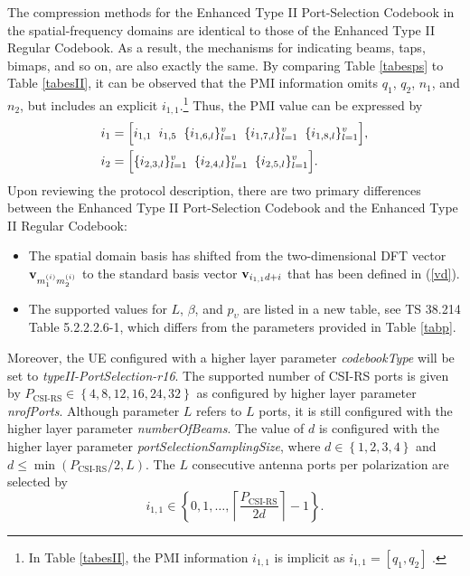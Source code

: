 \documentclass[lettersize,journal]{IEEEtran}
\begin{document}
\begin{appendices}
The compression methods for the Enhanced Type II Port-Selection Codebook in the spatial-frequency domains are identical to those of the Enhanced Type II Regular Codebook. As a result, the mechanisms for indicating beams, taps, bimaps, and so on, are also exactly the same. By comparing Table \ref{tabesps} to Table \ref{tabesII}, it can be observed that the PMI information omits $q_1$, $q_2$, $n_1$, and $n_2$, but includes an explicit $i_{1,1}$.\footnote{In Table \ref{tabesII}, the PMI information $i_{1,1}$ is implicit as $i_{1,1} = [q_1,q_2]$ .} Thus, the PMI value can be expressed by 
\begin{align}\label{a86}
&{i_1} = \Big[ {{i_{1,1}}\;\;{i_{1,5}}\;\;\{ {i_{1,6,l}}\} _{l = 1}^v\;\;\{ {i_{1,7,l}}\} _{l = 1}^v\;\;\{ {i_{1,8,l}}\} _{l = 1}^v} \Big],\notag\\
&{i_2} = \Big[ \{{{i_{2,3,l}}\} _{l = 1}^v\;\;\{ {i_{2,4,l}}\} _{l = 1}^v\;\;\{ {i_{2,5,l}}\} _{l = 1}^v} \Big].
\end{align}
Upon reviewing the protocol description, there are two primary differences between the Enhanced Type II Port-Selection Codebook and the Enhanced Type II Regular Codebook:

\begin{itemize}
    \item The spatial domain basis has shifted from the two-dimensional DFT vector ${\bf{v}}_{m_1^{(i)}m_2^{(i)}}$ to the standard basis vector ${\bf{v}}_{i_{1,1}d+i}$ that has been defined in (\ref{vd}).

    \item  The supported values for $L$, $\beta$, and $p_\upsilon$ are listed in a new table, see TS 38.214 Table 5.2.2.2.6-1, which differs from the parameters provided in Table \ref{tabp}.    
\end{itemize}
Moreover, the UE configured with a higher layer parameter \emph{codebookType} will be set to \emph{typeII-PortSelection-r16}. The supported number of CSI-RS ports is given by ${P_{{\text{CSI-RS}}}} \in \left\{ {4,8,12,16,24,32} \right\}$ as configured by higher layer parameter \emph{nrofPorts}. Although parameter $L$ refers to $L$ ports, it is still configured with the higher layer parameter \emph{numberOfBeams}. The value of $d$  is configured with the higher layer parameter \emph{portSelectionSamplingSize}, where $d \in \left\{ {1,2,3,4} \right\}$ and 
$d \le \min \left( {{P_{{\text{CSI-RS}}}}/2,L} \right)$. The $L$ consecutive antenna ports per polarization are selected by 
\begin{equation}
{i_{1,1}} \in \left\{ {0,1, \ldots ,\left\lceil {\frac{{{P_{{\text{CSI-RS}}}}}}{{2d}}} \right\rceil  - 1} \right\}.
\end{equation}

\end{appendices}
\end{document}
